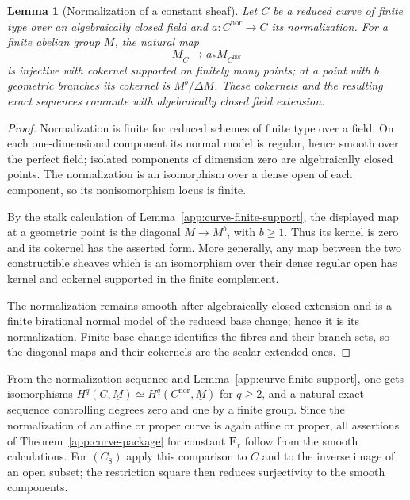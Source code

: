 \documentclass[11pt,a4paper]{article}
\numberwithin{equation}{section}
\newtheorem{lemma}[theorem]{Lemma}
\theoremstyle{definition}
\theoremstyle{remark}
\begin{document}
\begin{lemma}[Normalization of a constant sheaf]
\label{app:curve-normalization}
Let $C$ be a reduced curve of finite type over an algebraically closed
field and $a\colon C^{\mathrm{nor}}\to C$ its normalization.  For a
finite abelian group $M$, the natural map
\[
 \underline M_C\longrightarrow a_*\underline M_{C^{\mathrm{nor}}}
\]
is injective with cokernel supported on finitely many points; at a
point with $b$ geometric branches its cokernel is $M^b/\Delta M$.
These cokernels and the resulting exact sequences commute with
algebraically closed field extension.
\end{lemma}
\begin{proof}
Normalization is finite for reduced schemes of finite type over a
field.  On each one-dimensional component its normal model is regular,
hence smooth over the perfect field; isolated components of dimension
zero are algebraically closed points.  The normalization is an
isomorphism over a dense open of each component, so its
nonisomorphism locus is finite.

By the stalk calculation of Lemma~\ref{app:curve-finite-support}, the
displayed map at a geometric point is the diagonal $M\to M^b$, with
$b\geq1$.  Thus its kernel is zero and its cokernel has the asserted
form.  More generally, any map between the two constructible sheaves
which is an isomorphism over their dense regular open has kernel and
cokernel supported in the finite complement.

The normalization remains smooth after algebraically closed extension
and is a finite birational normal model of the reduced base change;
hence it is its normalization.  Finite base change identifies the
fibres and their branch sets, so the diagonal maps and their cokernels
are the scalar-extended ones.
\end{proof}

From the normalization sequence and
Lemma~\ref{app:curve-finite-support}, one gets isomorphisms
$H^q(C,\underline M)\simeq H^q(C^{\mathrm{nor}},\underline M)$
for $q\geq2$, and a natural exact sequence controlling degrees zero
and one by a finite group.  Since the normalization of an affine or
proper curve is again affine or proper, all assertions of
Theorem~\ref{app:curve-package} for constant $\mathbf F_r$ follow from
the smooth calculations.  For $(C_8)$ apply this comparison to $C$ and
to the inverse image of an open subset; the restriction square then
reduces surjectivity to the smooth components.
\end{document}

